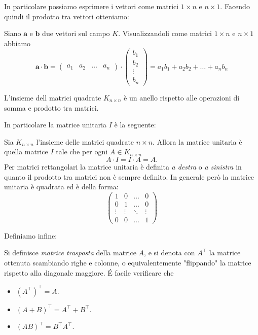 \documentclass[11pt]{scrartcl}
\begin{document}
 	In particolare possiamo esprimere i vettori come matrici $1\times n$ e $n\times 1$. Facendo quindi il prodotto tra vettori otteniamo:
 	\begin{definition}
 		Siano $\mathbf{a}$ e $\mathbf{b}$ due vettori sul campo $K$. Visualizzandoli come matrici $1\times n$ e $n\times 1$ abbiamo
 		$$\mathbf{a}\cdot \mathbf{b} =
 		\begin{pmatrix}
 			a_1 & a_2 & \dots & a_n
 		\end{pmatrix}
 		\cdot 
 		\begin{pmatrix}
 			b_1 \\
 			b_2 \\
 			\vdots \\
 			b_n
 		\end{pmatrix}
 		=a_1b_1+a_2b_2+\dots +a_nb_n
 		$$
 	\end{definition}
 	\begin{theorem}
 		L'insieme dell matrici quadrate $K_{n\times n}$ è un anello rispetto alle operazioni di somma e prodotto tra matrici.
 	\end{theorem}
 	In particolare la matrice unitaria $I$ è la seguente:
 	\begin{definition}
 		Sia $K_{n\times n}$ l'insieme delle matrici quadrate $n\times n$. Allora la matrice unitaria è quella matrice $I$ tale che per ogni $A\in K_{n\times n}$
 		$$A\cdot I = I \cdot A = A.$$
 		Per matrici rettangolari la matrice unitaria è definita \textit{a destra} o \textit{a sinistra} in quanto il prodotto tra matrici non è sempre definito. In generale però la matrice unitaria è quadrata ed è della forma:
 		$$
 		\begin{pmatrix}
 			1 & 0 & \dots & 0 \\
 			0 & 1 & \dots & 0 \\
 			\vdots&\vdots &\ddots & \vdots \\
 			0 & 0 & \dots & 1
 		\end{pmatrix}
 		$$
 	\end{definition}
 	Definiamo infine:
 	\begin{definition}
 		Si definisce \textit{matrice trasposta} della matrice $A$, e si denota con $A^\intercal$ la matrice ottenuta scambiando righe e colonne, o equivalentemente "flippando" la matrice rispetto alla diagonale maggiore. \'E facile verificare che 
 		\begin{itemize}
 			\item $(A^\intercal)^\intercal=A$.
 			\item $(A+B)^\intercal=A^\intercal+B^\intercal$.
 			\item $(AB)^\intercal=B^\intercal A^\intercal$.
 		\end{itemize}
 	\end{definition}
\end{document}
